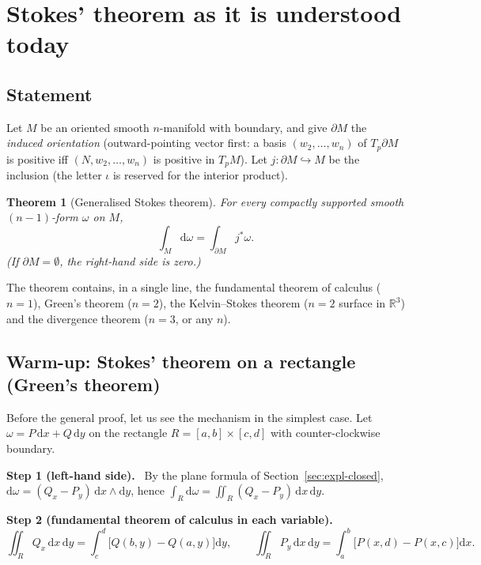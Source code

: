 \documentclass[11pt,a4paper]{article}
\newcounter{thm}[section]
\numberwithin{equation}{section}
\theoremstyle{definition}
\theoremstyle{plain}
\newtheorem{theorem}[thm]{Theorem}
\newcommand{\Step}[2]{\textbf{Step #1 (#2).}\ }
\newcommand{\R}{\mathbb{R}}
\newcommand{\dd}{\mathrm{d}}
\newcommand{\pb}{{}^{*}}                            %
\begin{document}
\section{Stokes' theorem as it is understood today}\label{sec:stokes}

\subsection{Statement}

Let $M$ be an oriented smooth $n$-manifold with boundary, and give $\partial M$ the \emph{induced orientation} (outward-pointing vector first: a basis $(w_2,\dots,w_n)$ of $T_p\partial M$ is positive iff $(N,w_2,\dots,w_n)$ is positive in $T_pM$). Let $j:\partial M\hookrightarrow M$ be the inclusion (the letter $\iota$ is reserved for the interior product).

\begin{theorem}[Generalised Stokes theorem]\label{thm:stokes}
For every compactly supported smooth $(n-1)$-form $\omega$ on $M$,
\begin{equation}\label{eq:stokes}
\int_M\dd\omega=\int_{\partial M}j\pb\omega .
\end{equation}
(If $\partial M=\emptyset$, the right-hand side is zero.)
\end{theorem}

The theorem contains, in a single line, the fundamental theorem of calculus ($n=1$), Green's theorem ($n=2$), the Kelvin--Stokes theorem ($n=2$ surface in $\R^3$) and the divergence theorem ($n=3$, or any $n$).

\subsection{Warm-up: Stokes' theorem on a rectangle (Green's theorem)}\label{sec:green}

Before the general proof, let us see the mechanism in the simplest case. Let $\omega=P\,\dd x+Q\,\dd y$ on the rectangle $R=[a,b]\times[c,d]$ with counter-clockwise boundary.

\Step{1}{left-hand side} By the plane formula of Section~\ref{sec:expl-closed}, $\dd\omega=(Q_x-P_y)\,\dd x\wedge\dd y$, hence $\int_R\dd\omega=\iint_R(Q_x-P_y)\,\dd x\,\dd y$.

\Step{2}{fundamental theorem of calculus in each variable}
\[
\iint_RQ_x\,\dd x\,\dd y=\int_c^d\bigl[Q(b,y)-Q(a,y)\bigr]\dd y,\qquad
\iint_RP_y\,\dd x\,\dd y=\int_a^b\bigl[P(x,d)-P(x,c)\bigr]\dd x .
\]
\end{document}
